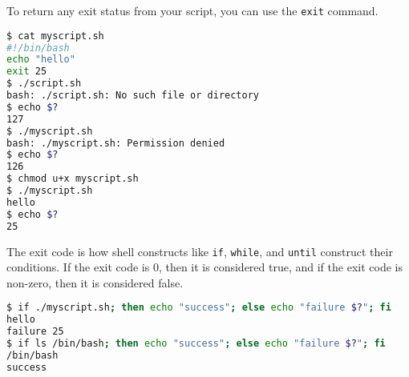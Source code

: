 To return any exit status from your script, you can use the \texttt{exit} command.

\begin{lstlisting}[language=bash]
$ cat myscript.sh
#!/bin/bash
echo "hello"
exit 25
$ ./script.sh
bash: ./script.sh: No such file or directory
$ echo $?
127
$ ./myscript.sh
bash: ./myscript.sh: Permission denied
$ echo $?
126
$ chmod u+x myscript.sh
$ ./myscript.sh
hello
$ echo $?
25
\end{lstlisting}

The exit code is how shell constructs like \texttt{if}, \texttt{while},
and \texttt{until} construct their conditions. If the exit code is 0,
then it is considered true, and if the exit code is non-zero, then it
is considered false.

\begin{lstlisting}[language=bash]
$ if ./myscript.sh; then echo "success"; else echo "failure $?"; fi
hello
failure 25
$ if ls /bin/bash; then echo "success"; else echo "failure $?"; fi
/bin/bash
success
\end{lstlisting}
